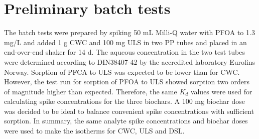 \section{Preliminary batch tests}
The batch tests were prepared by spiking 50 mL Milli-Q water with PFOA to 1.3 mg/L and added 1 g CWC and 100 mg ULS in two PP tubes and placed in an end-over-end shaker for 14 d. The aqueous concentration in the two test tubes were determined according to DIN38407-42 by the accredited laboratory Eurofins Norway. Sorption of PFCA to ULS was expected to be lower than for CWC. However, the test run for sorption of PFOA to ULS showed sorption two orders of magnitude higher than expected. Therefore, the same $K_d$ values were used for calculating spike concentrations for the three biochars. A 100 mg biochar dose was decided to be ideal to balance convenient spike concentrations with sufficient sorption. In summary, the same analyte spike concentrations and biochar doses were used to make the isotherms for CWC, ULS and DSL.


